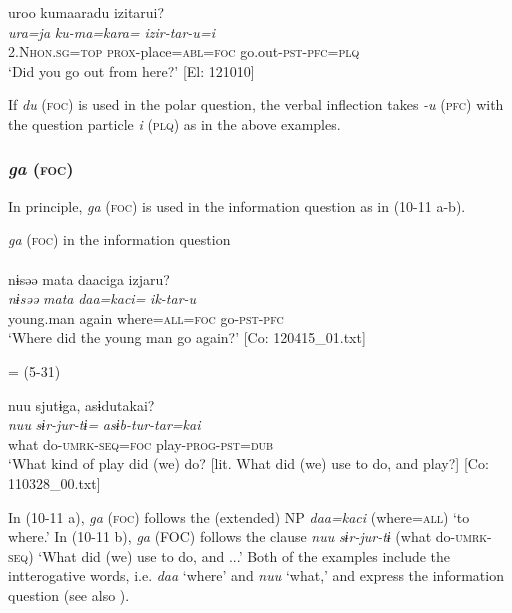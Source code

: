   \ex  %
      \glll    uroo  kumaaradu  izitarui?\\
      \textit{ura=ja}  \textit{ku-ma=kara=}  \textit{izir-tar-u=i}\\
      2.N\textsc{hon}.\textsc{sg}=\textsc{top}  \textsc{prox}-place=\textsc{abl}=\textsc{foc}  go.out-\textsc{pst}-\textsc{pfc}=\textsc{plq}\\
      \glt       ‘Did you go out from here?’ [El: 121010]
\z
\z

If \textit{du} (\textsc{foc}) is used in the polar question, the verbal inflection takes \textit{{}-u} (\textsc{pfc}) with the question particle \textit{i} (\textsc{plq}) as in the above examples.

\subsubsection{\textit{ga} (\textsc{foc})}\label{sec:10.1.2.2}

In principle, \textit{ga} (\textsc{foc}) is used in the information question as in (10-11 a-b).

\ea\label{ex:10.11}   \textit{ga} (\textsc{foc}) in the information question\\
  \ea\relax [= (5-34 a)]\\
      \glll    nɨsəə  mata  daaciga  izjaru?\\
      \textit{nɨsəə}  \textit{mata}  \textit{daa=kaci=}  \textit{ik-tar-u}\\
      young.man  again  where=\textsc{all}=\textsc{foc}  go-\textsc{pst}-\textsc{pfc}\\
      \glt       ‘Where did the young man go again?’ [Co: 120415\_01.txt]

  \ex{} = (5-31)

      \glll    nuu  sjutɨga,  asɨdutakai?\\
      \textit{nuu}  \textit{sɨr-jur-tɨ=}  \textit{asɨb-tur-tar=kai}\\
      what  do-\textsc{umrk}-\textsc{seq}=\textsc{foc}  play-\textsc{prog}-\textsc{pst}=\textsc{dub}\\
      \glt       ‘What kind of play did (we) do? [lit. What did (we) use to do, and play?] [Co: 110328\_00.txt]
    \z
\z

In (10-11 a), \textit{ga} (\textsc{foc}) follows the (extended) NP \textit{daa=kaci} (where=\textsc{all}) ‘to where.’ In (10-11 b), \textit{ga} (FOC) follows the clause \textit{nuu} \textit{sɨr-jur-tɨ} (what do-\textsc{umrk}-\textsc{seq}) ‘What did (we) use to do, and ...’ Both of the examples include the intterogative words, i.e. \textit{daa} ‘where’ and \textit{nuu} ‘what,’ and express the information question (see also ).

